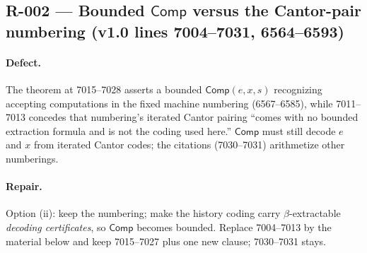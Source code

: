 
\subsection*{R-002 --- Bounded \(\mathsf{Comp}\) versus the Cantor-pair numbering (v1.0 lines 7004--7031, 6564--6593)}

\paragraph{Defect.} The theorem at 7015--7028 asserts a bounded \(\mathsf{Comp}(e,x,s)\) recognizing accepting computations in the fixed machine numbering (6567--6585), while 7011--7013 concedes that numbering's iterated Cantor pairing ``comes with no bounded extraction formula and is not the coding used here.''  \(\mathsf{Comp}\) must still decode \(e\) and \(x\) from iterated Cantor codes; the citations (7030--7031) arithmetize other numberings.

\paragraph{Repair.} Option (ii): keep the numbering; make the history coding carry \(\beta\)-extractable \emph{decoding certificates}, so \(\mathsf{Comp}\) becomes bounded.  Replace 7004--7013 by the material below and keep 7015--7027 plus one new clause; 7030--7031 stays.

